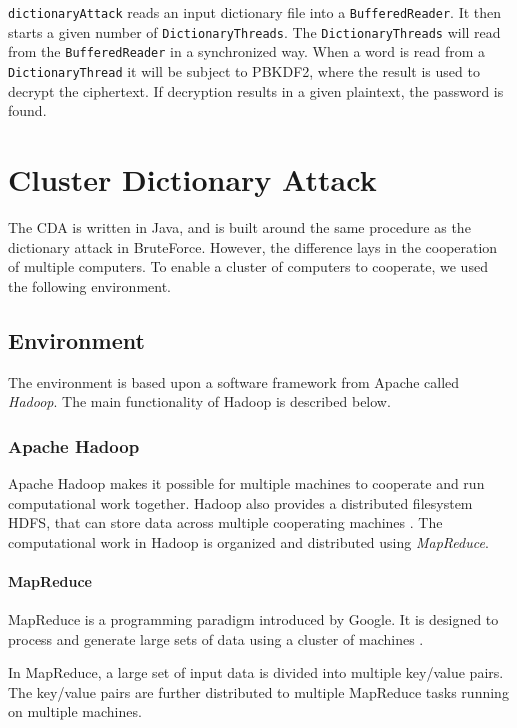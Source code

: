 \documentclass[pdftex,english,10pt,b5paper,twoside]{book}
\begin{document}
\texttt{dictionaryAttack} reads an input dictionary file into a
\texttt{BufferedReader}. It then starts a given number of
\texttt{DictionaryThreads}. The \texttt{DictionaryThreads} will read from the
\texttt{BufferedReader} in a synchronized way. When a word is read from a
\texttt{DictionaryThread} it will be subject to PBKDF2, where the result is
used to decrypt the ciphertext. If decryption results in a given plaintext, the
password is found.

\section{Cluster Dictionary Attack}

The \ac{CDA} is written in Java, and is built around the same procedure as the
dictionary attack in BruteForce. However, the difference lays in the cooperation
of multiple computers. To enable a cluster of computers to cooperate, we used
the following environment.

\subsection{Environment}

The environment is based upon a software framework from Apache called
\emph{Hadoop}. The main functionality of Hadoop is described below.

\subsubsection{Apache Hadoop}

Apache Hadoop makes it possible for multiple machines to cooperate
and run computational work together. Hadoop also provides a distributed filesystem
\ac{HDFS}, that can store data across multiple cooperating machines \cite{hadoop}. The
computational work in Hadoop is organized and distributed using \emph{MapReduce}.

\paragraph{MapReduce} MapReduce is a programming paradigm introduced by Google.
It is designed to process and generate large sets of data using a cluster of
machines \cite{mapred}. 

In MapReduce, a large set of input data is divided into multiple key/value
pairs. The key/value pairs are further distributed to multiple MapReduce tasks
running on multiple machines. 
\end{document}
